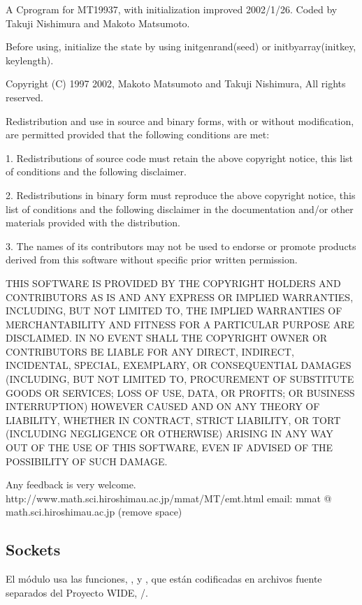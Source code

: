 \documentclass[a4,10pt,spanish]{sphinxmanual}
\begin{document}
\begin{sphinxVerbatim}[commandchars=\\\{\}]
A C\PYGZhy{}program for MT19937, with initialization improved 2002/1/26.
Coded by Takuji Nishimura and Makoto Matsumoto.

Before using, initialize the state by using init\PYGZus{}genrand(seed)
or init\PYGZus{}by\PYGZus{}array(init\PYGZus{}key, key\PYGZus{}length).

Copyright (C) 1997 \PYGZhy{} 2002, Makoto Matsumoto and Takuji Nishimura,
All rights reserved.

Redistribution and use in source and binary forms, with or without
modification, are permitted provided that the following conditions
are met:

 1. Redistributions of source code must retain the above copyright
    notice, this list of conditions and the following disclaimer.

 2. Redistributions in binary form must reproduce the above copyright
    notice, this list of conditions and the following disclaimer in the
    documentation and/or other materials provided with the distribution.

 3. The names of its contributors may not be used to endorse or promote
    products derived from this software without specific prior written
    permission.

THIS SOFTWARE IS PROVIDED BY THE COPYRIGHT HOLDERS AND CONTRIBUTORS
\PYGZdq{}AS IS\PYGZdq{} AND ANY EXPRESS OR IMPLIED WARRANTIES, INCLUDING, BUT NOT
LIMITED TO, THE IMPLIED WARRANTIES OF MERCHANTABILITY AND FITNESS FOR
A PARTICULAR PURPOSE ARE DISCLAIMED.  IN NO EVENT SHALL THE COPYRIGHT OWNER OR
CONTRIBUTORS BE LIABLE FOR ANY DIRECT, INDIRECT, INCIDENTAL, SPECIAL,
EXEMPLARY, OR CONSEQUENTIAL DAMAGES (INCLUDING, BUT NOT LIMITED TO,
PROCUREMENT OF SUBSTITUTE GOODS OR SERVICES; LOSS OF USE, DATA, OR
PROFITS; OR BUSINESS INTERRUPTION) HOWEVER CAUSED AND ON ANY THEORY OF
LIABILITY, WHETHER IN CONTRACT, STRICT LIABILITY, OR TORT (INCLUDING
NEGLIGENCE OR OTHERWISE) ARISING IN ANY WAY OUT OF THE USE OF THIS
SOFTWARE, EVEN IF ADVISED OF THE POSSIBILITY OF SUCH DAMAGE.


Any feedback is very welcome.
http://www.math.sci.hiroshima\PYGZhy{}u.ac.jp/\PYGZti{}m\PYGZhy{}mat/MT/emt.html
email: m\PYGZhy{}mat @ math.sci.hiroshima\PYGZhy{}u.ac.jp (remove space)
\end{sphinxVerbatim}


\subsection{Sockets}
\label{\detokenize{license:sockets}}
\sphinxAtStartPar
El módulo  usa las funciones, , y , que están codificadas en archivos fuente separados del Proyecto WIDE,  /.
\end{document}
